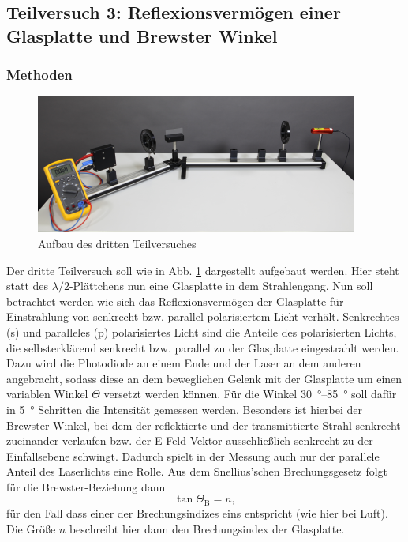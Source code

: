 \subsection{Teilversuch 3: Reflexionsvermögen einer Glasplatte und Brewster Winkel}

	\subsubsection*{Methoden}
		
		\begin{figure}[ht]
			\centering
			\includegraphics[width=\textwidth]{bilder/Brewster-Winkel.png}
			\caption{Aufbau des dritten Teilversuches\cite{WWU}}
			\label{fig:Glasplatte}	
		\end{figure}
		Der dritte Teilversuch soll wie in Abb. \ref{fig:Glasplatte} dargestellt aufgebaut werden.
		Hier steht statt des $\lambda/2$-Plättchens nun eine Glasplatte in dem Strahlengang.
		Nun soll betrachtet werden wie sich das Reflexionsvermögen der Glasplatte für Einstrahlung von senkrecht bzw. parallel polarisiertem Licht verhält.
		Senkrechtes (s) und paralleles (p) polarisiertes Licht sind die Anteile des polarisierten Lichts, die selbsterklärend senkrecht bzw. parallel zu der Glasplatte eingestrahlt werden.
		Dazu wird die Photodiode an einem Ende und der Laser an dem anderen angebracht, sodass diese an dem beweglichen Gelenk mit der Glasplatte um einen variablen Winkel $\Theta$ versetzt werden können.
		Für die Winkel \SIrange{30}{85}{\degree} soll dafür in \SI{5}{\degree} Schritten die Intensität gemessen werden.
		Besonders ist hierbei der Brewster-Winkel, bei dem der reflektierte und der transmittierte Strahl senkrecht zueinander verlaufen bzw. der E-Feld Vektor ausschließlich senkrecht zu der Einfallsebene schwingt.
		Dadurch spielt in der Messung auch nur der parallele Anteil des Laserlichts eine Rolle.
		Aus dem Snellius'schen Brechungsgesetz folgt für die Brewster-Beziehung dann
		\begin{equation} \label{eq:Brewster}
			\tan{\Theta_\text{B}} = n,
		\end{equation}
		für den Fall dass einer der Brechungsindizes eins entspricht (wie hier bei Luft).
		Die Größe $n$ beschreibt hier dann den Brechungsindex der Glasplatte.

